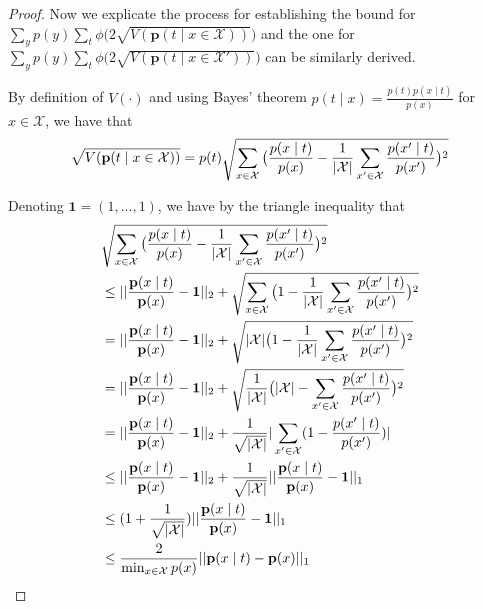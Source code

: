 \documentclass{article} \usepackage{iclr2021_conference,times}
\theoremstyle{definition}
\theoremstyle{remark}
\newcommand{\modified}[1]{{\color{black}{#1}}}
\begin{document}
\begin{proof}
Now we explicate the process for establishing the bound for $\sum_y p(y) \sum_t \phi \big( 2\sqrt{V(\mathbf{p}(t \mid x \in \mathcal{X}))} \big)$ and the one for $\sum_y p(y) \sum_t \phi \big( 2\sqrt{V(\mathbf{p}(t \mid x \in \mathcal{X'}))} \big)$ can be similarly derived.

By deﬁnition of $V(\cdot)$ and using Bayes' theorem $p(t \mid x) = \frac{p(t)p(x \mid t)}{p(x)}$ for $x \in \mathcal{X}$, we have that
\begin{align}
    \sqrt{V(\mathbf{p}(t \mid x \in \mathcal{X}))} = p(t) \sqrt{ \sum_{x\in \mathcal{X}} \big( \frac{p(x \mid t)}{p(x)} - \frac{1}{|\mathcal{X|}} \sum_{x' \in \mathcal{X}} \frac{p(x' \mid t)}{p(x')} \big)\modified{^2} } \label{eq:Vp}
\end{align}

Denoting $\mathbf{1} = (1,..., 1)$, we have by the triangle inequality that 
\begin{align}
    & \sqrt{ \sum_{x\in \mathcal{X}} \big( \frac{p(x \mid t)}{p(x)} - \frac{1}{|\mathcal{X|}} \sum_{x' \in \mathcal{X}} \frac{p(x' \mid t)}{p(x')} \big)\modified{^2} } \\
    & \le || \frac{\mathbf{p}(x \mid t)}{\mathbf{p}(x)} - \mathbf{1}||_2 + \sqrt{ \sum_{x\in \mathcal{X}} \big( 1 - \frac{1}{|\mathcal{X|}} \sum_{x' \in \mathcal{X}} \frac{p(x' \mid t)}{p(x')} \big)\modified{^2} } \\
    &= || \frac{\mathbf{p}(x \mid t)}{\mathbf{p}(x)} - \mathbf{1}||_2 + \sqrt{ |\mathcal{X}| \big( 1 - \frac{1}{|\mathcal{X|}} \sum_{x' \in \mathcal{X}} \frac{p(x' \mid t)}{p(x')} \big)\modified{^2} } \\
    &= || \frac{\mathbf{p}(x \mid t)}{\mathbf{p}(x)} - \mathbf{1}||_2 + \sqrt{  \frac{1}{|\mathcal{X|}} \big( |\mathcal{X}| - \sum_{x' \in \mathcal{X}} \frac{p(x' \mid t)}{p(x')} \big)\modified{^2} } \\
    &= || \frac{\mathbf{p}(x \mid t)}{\mathbf{p}(x)} - \mathbf{1}||_2 + \frac{1}{\sqrt{|\mathcal{X}|}} | \sum_{x' \in \mathcal{X}} (1 - \frac{p(x' \mid t)}{p(x')} ) | \\
    &\le || \frac{\mathbf{p}(x \mid t)}{\mathbf{p}(x)} - \mathbf{1}||_2 + \frac{1}{\sqrt{|\mathcal{X}|}} || \frac{\mathbf{p}(x \mid t)}{\mathbf{p}(x)} - \mathbf{1}||_1 \\
    &\le ( 1 + \frac{1}{\sqrt{|\mathcal{X}|}}) || \frac{\mathbf{p}(x \mid t)}{\mathbf{p}(x)} - \mathbf{1}||_1 \\
    & \le \frac{2}{\min_{x \in \mathcal{X}} p(x)} || {\mathbf{p}(x \mid t) - \mathbf{p}(x)}||_1 \label{eq:l1_bound}

\end{align}
\end{proof}
\end{document}
